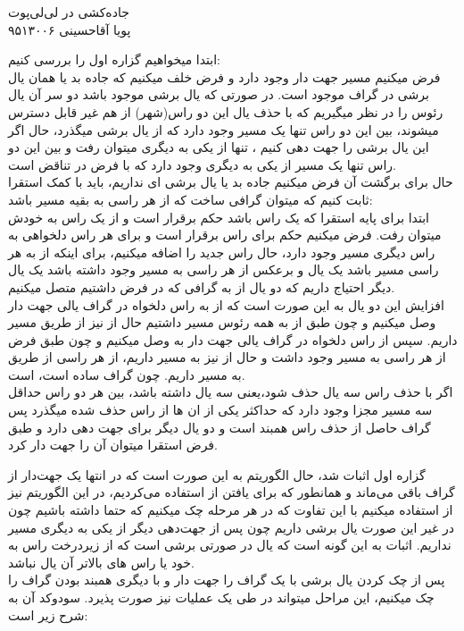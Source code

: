 \documentclass[11pt]{letter}
\begin{document}
	\begin{center}
		{\huge جاده‌کشی در لی‌لی‌پوت}\\
		{ پویا آقاحسینی ۹۵۱۳۰۰۶}
	\end{center}
	\begin{RTL}
ابتدا میخواهیم گزاره اول را بررسی کنیم:\\
فرض میکنیم مسیر جهت دار وجود دارد و فرض خلف میکنیم که جاده بد یا همان یال برشی در گراف موجود است. در صورتی که یال برشی موجود باشد دو سر آن یال رئوس 
را در نظر میگیریم که با حذف یال این دو راس(شهر) از هم غیر قابل دسترس میشوند، بین این دو راس تنها یک مسیر وجود دارد که از یال برشی میگذرد، حال اگر این یال برشی را جهت دهی کنیم ، تنها از یکی به دیگری میتوان رفت و بین این دو راس تنها یک مسیر از یکی به دیگری وجود دارد که با فرض در تناقض است. \\
حال برای برگشت آن فرض میکنیم جاده بد یا یال برشی ای نداریم، باید با کمک استقرا ثابت کنیم که میتوان گرافی ساخت که از هر راسی به بقیه مسیر باشد:\\
ابتدا برای پایه استقرا که یک راس باشد حکم برقرار است و از یک راس به خودش میتوان رفت.
فرض میکنیم حکم برای 
راس برقرار است و برای هر راس دلخواهی به راس دیگری مسیر وجود دارد، حال راس جدید
را اضافه میکنیم، برای اینکه از
به هر راسی مسیر باشد یک یال و برعکس از هر راسی به 
مسیر وجود داشته باشد یک یال دیگر احتیاج داریم که دو یال از 
به گرافی که در فرض داشتیم متصل میکنیم. \\
افزایش این دو یال به این صورت است که از
به راس دلخواه 
در گراف یالی جهت دار وصل میکنیم و چون طبق از 
به همه رئوس مسیر داشتیم حال از 
نیز از طریق 
مسیر داریم.
سپس از راس دلخواه 
در گراف یالی جهت دار به
وصل میکنیم و چون طبق فرض از هر راسی به 
مسیر وجود داشت و حال از 
نیز به
مسیر داریم، از هر راسی از طریق
به 
مسیر داریم.
چون گراف ساده است، 
است.\\
اگر با حذف راس سه یال حذف شود،یعنی سه یال داشته باشد، بين هر دو راس حداقل سه مسير مجزا وجود دارد كه حداكثر يكى از ان ها از راس حذف شده ميگذرد پس گراف حاصل از حذف راس 
همبند است و 
دو یال دیگر برای جهت دهی دارد
و طبق فرض استقرا ميتوان آن را جهت دار كرد.


گزاره اول اثبات شد، حال الگوریتم به این صورت است که در انتها یک 
جهت‌دار از گراف باقی می‌ماند و همانطور که برای یافتن 
از
استفاده می‌کردیم، در این الگوریتم نیز از
استفاده میکنیم با این تفاوت که در هر مرحله چک میکنیم که حتما
داشته باشیم چون در غیر این صورت یال برشی داریم چون پس از جهت‌دهی دیگر از یکی به دیگری مسیر نداریم. اثبات به این گونه است که یال
در صورتی برشی است که از زیردرخت راس
به خود 
یا راس های بالاتر آن یال نباشد.\\
پس از چک کردن یال برشی با یک
گراف را جهت دار و با 
دیگری همبند بودن گراف را چک میکنیم، این مراحل میتواند در طی یک عملیات 
نیز صورت پذیرد.
سودوکد آن به شرح زیر است:
				\end{RTL}
\end{document}
